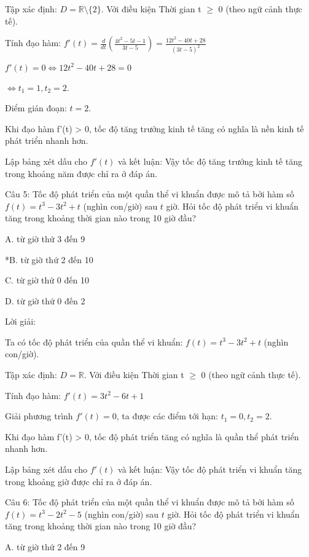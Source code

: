 \documentclass[a4paper,12pt]{article}
\begin{document}
Tập xác định: \(D = \mathbb{R} \setminus \{2\}\).
Với điều kiện Thời gian t $\geq$ 0 (theo ngữ cảnh thực tế).

Tính đạo hàm:
\(f'(t) = \frac{d}{dt}\left(\frac{4t^2-5t-1}{3t-5}\right) = \frac{12t^2-40t+28}{\left(3t-5\right)^2}\)

\(f'(t) = 0 \Leftrightarrow 12t^2-40t+28 = 0\)

\(\Leftrightarrow t_1 = 1, t_2 = 2\).

Điểm gián đoạn: \(t = 2\).

Khi đạo hàm f'(t) > 0, tốc độ tăng trưởng kinh tế tăng có nghĩa là nền kinh tế phát triển nhanh hơn.

Lập bảng xét dấu cho \(f'(t)\) và kết luận: Vậy tốc độ tăng trưởng kinh tế tăng trong khoảng năm được chỉ ra ở đáp án.



Câu 5: Tốc độ phát triển của một quần thể vi khuẩn được mô tả bởi hàm số \(f(t) = t^{3}- 3t^{2}+ t\) (nghìn con/giờ) sau \(t\) giờ. 
            Hỏi tốc độ phát triển vi khuẩn tăng trong khoảng thời gian nào trong 10 giờ đầu?

A. từ giờ thứ 3 đến 9

*B. từ giờ thứ 2 đến 10

C. từ giờ thứ 0 đến 10

D. từ giờ thứ 0 đến 2

Lời giải:

Ta có tốc độ phát triển của quần thể vi khuẩn: \(f(t) = t^{3}- 3t^{2}+ t\) (nghìn con/giờ).

Tập xác định: \(D = \mathbb{R}\).
Với điều kiện Thời gian t $\geq$ 0 (theo ngữ cảnh thực tế).

Tính đạo hàm:
\(f'(t) = 3t^{2}- 6t+ 1\)

Giải phương trình \(f'(t) = 0\), ta được các điểm tới hạn:
\(t_1 = 0, t_2 = 2\).



Khi đạo hàm f'(t) > 0, tốc độ phát triển tăng có nghĩa là quần thể phát triển nhanh hơn.

Lập bảng xét dấu cho \(f'(t)\) và kết luận: Vậy tốc độ phát triển vi khuẩn tăng trong khoảng giờ được chỉ ra ở đáp án.



Câu 6: Tốc độ phát triển của một quần thể vi khuẩn được mô tả bởi hàm số \(f(t) = t^{3}- 2t^{2}- 5\) (nghìn con/giờ) sau \(t\) giờ. 
            Hỏi tốc độ phát triển vi khuẩn tăng trong khoảng thời gian nào trong 10 giờ đầu?

A. từ giờ thứ 2 đến 9
\end{document}
